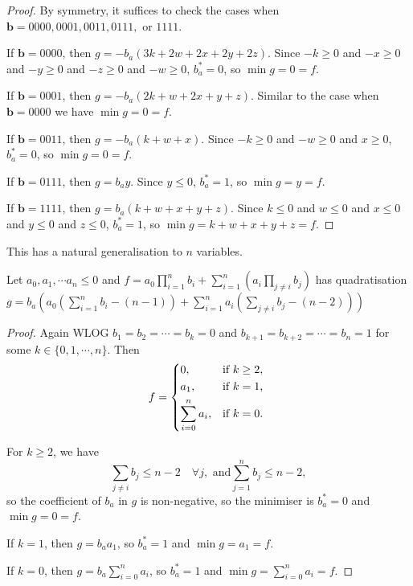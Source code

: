 \documentclass[11pt]{scrartcl}
\newcommand{\vc}[1]{\boldsymbol{#1}}
\begin{document}
\begin{proof}
By symmetry, it suffices to check the cases when $\vc b = 0000, 0001, 0011, 0111, $ or $1111$.

If $\vc b = 0000$, then $g = -b_a(3k + 2w + 2x + 2y + 2z)$. Since $-k \ge 0$ and $-x \ge 0$ and $-y \ge 0$ and $-z \ge 0$ and $-w \ge 0$, $b_a^* = 0$, so $\min g = 0 = f$.

If $\vc b = 0001$, then $g = -b_a(2k + w + 2x + y + z)$. Similar to the case when $\vc b = 0000$ we have $\min g = 0 = f$.

If $\vc b = 0011$, then $g = -b_a(k + w + x)$. Since $-k \ge 0$ and $-w \ge 0$ and $x \ge 0$, $b_a^* = 0$, so $\min g = 0 = f$.

If $\vc b = 0111$, then $g = b_ay$. Since $y \le 0$, $b_a^* = 1$, so $\min g = y = f$.

If $\vc b = 1111$, then $g = b_a(k + w + x + y + z)$. Since $k \le 0$ and $w \le 0$ and $x \le 0$ and $y \le 0$ and $z \le 0$, $b_a^* = 1$, so $\min g = k + w + x + y + z  = f$.

\end{proof}

This has a natural generalisation to $n$ variables.

\begin{theorem}
	Let $a_0, a_1, \cdots a_n \le 0$ and $f = a_0 \prod_{i = 1}^n b_i + \sum_{i = 1}^n \left( a_i \prod_{j \neq i} b_j\right)$ has quadratisation $g = b_a \left(a_0\left(\sum_{i=1}^n b_i - (n-1)\right) + \sum_{i=1}^n a_i \left( \sum_{j \neq i} b_j - (n-2)\right) \right) $
\end{theorem}

\begin{proof}
	Again WLOG $b_1 = b_2 = \cdots = b_k = 0$ and $b_{k+1} = b_{k+2} = \cdots = b_n = 1$ for some $k \in \{0, 1, \cdots, n\}$.
	Then \[
 f = \begin{dcases*}
        0,  & if $k \ge 2$,\\
        a_1, & if $k = 1$,\\
	\sum_{i=0}^n a_i, & if $k = 0$.
        \end{dcases*}
\]

For $k \ge 2$, we have \[
	\sum_{j\neq i } b_j \le n-2 \quad \forall j, \text{ and} \sum_{j = 1}^n b_j \le n-2,
\]
so the coefficient of $b_a$ in $g$ is non-negative, so the minimiser is $b_a^* = 0$ and $\min g = 0 = f$.

If $k = 1$, then $g = b_a a_1$, so $b_a^* = 1$ and $\min g = a_1 = f$.

If $k = 0$, then $g = b_a \sum_{i=0}^n a_i$, so $b_a^* = 1$ and $\min g = \sum_{i=0}^n a_i = f$.

\end{proof}
\end{document}
